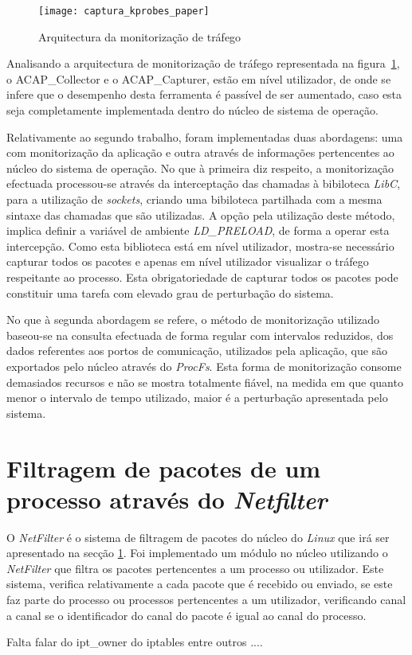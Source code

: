 \begin{figure}[h!]
       \centering
       \texttt{[image: captura\_kprobes\_paper]}
       \caption{Arquitectura da monitorização de tráfego}
	\label{fig:paper_capture_kprobes}
\end{figure}


Analisando a arquitectura de monitorização de tráfego representada na figura~\ref{fig:paper_capture_kprobes}, o ACAP\_Collector e o ACAP\_Capturer, estão em nível utilizador, de onde se infere que o desempenho desta ferramenta é passível de ser aumentado, caso esta seja completamente implementada dentro do núcleo de sistema de operação.

Relativamente ao segundo trabalho, foram implementadas duas abordagens: uma com monitorização da aplicação e outra através de informações pertencentes ao núcleo do sistema de operação.
No que à primeira diz respeito, a monitorização efectuada processou-se através da interceptação das chamadas à bibiloteca \textit{LibC}, para a utilização de \textit{sockets}, criando uma bibiloteca partilhada com a mesma sintaxe das chamadas que são utilizadas.
A opção pela utilização deste método, implica definir a variável de ambiente \textit{LD\_PRELOAD}, de forma a operar esta intercepção.
Como esta biblioteca está em nível utilizador, mostra-se necessário capturar todos os pacotes e apenas em nível utilizador visualizar o tráfego respeitante ao processo.
Esta obrigatoriedade de capturar todos os pacotes pode constituir uma tarefa com elevado grau de perturbação do sistema.

No que à segunda abordagem se refere, o método de monitorização utilizado baseou-se na consulta efectuada de forma regular com intervalos reduzidos, dos dados referentes aos portos de comunicação, utilizados pela aplicação, que são exportados pelo núcleo através do \textit{ProcFs}.
Esta forma de monitorização consome demasiados recursos e não se mostra totalmente fiável, na medida em que quanto menor o intervalo de tempo utilizado, maior é a perturbação apresentada pelo sistema.

\section{Filtragem de pacotes de um processo através do \textit{Netfilter}}

O \textit{NetFilter} é o sistema de filtragem de pacotes do núcleo do \textit{Linux} que irá ser apresentado na secção \ref{}.
Foi implementado um módulo no núcleo utilizando o \textit{NetFilter} que filtra os pacotes pertencentes a um processo ou utilizador.
Este sistema, verifica relativamente a cada pacote que é recebido ou enviado, se este faz parte do processo ou processos pertencentes a um utilizador, verificando canal a canal se o identificador do canal do pacote é igual ao canal do processo.





Falta falar do ipt\_owner do iptables entre outros ....

